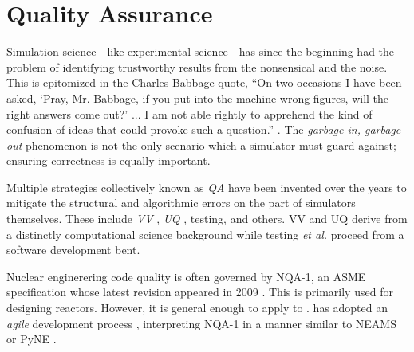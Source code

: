 \section{Quality Assurance}
%

%


Simulation science - like experimental science - has since the beginning had the 
problem of identifying trustworthy results from the nonsensical and the noise.
This is epitomized in the Charles Babbage quote, ``On two occasions I have been asked, 
`Pray, Mr. Babbage, if you put into the machine wrong figures, will the right 
answers come out?' ... I am not able rightly to apprehend the kind of confusion 
of ideas that could provoke such a question.'' \cite{babbage_passages_2011}. 
The \emph{garbage in, garbage out} phenomenon is not the only scenario which a
simulator must guard against; ensuring correctness is equally important.

Multiple strategies collectively known as \emph{\gls{QA}} have 
been invented over the years to mitigate the structural and algorithmic errors
on the part of simulators themselves. These include \emph{\gls{VV}}
\cite{boehm_software_1989}, \emph{\gls{UQ}} 
\cite{sacks_design_1989}, testing, and others. \gls{VV} and \gls{UQ} derive from 
a distinctly computational science background while testing \emph{et al.}
proceed from a software development bent. 

Nuclear enginerering code quality is often governed by NQA-1, an ASME specification 
whose latest revision appeared in 2009 \cite{asme_nqa-1a-2009_2009}. This is primarily 
used for designing reactors. However, it is general enough to apply to 
\Cyclus. \Cyclus has adopted an \emph{agile} development process 
\cite{larman_agile_2004}, 
interpreting NQA-1 in a manner similar to NEAMS \cite{neams_nuclear_2013} or 
PyNE \cite{biondo_quality_2014}. 

